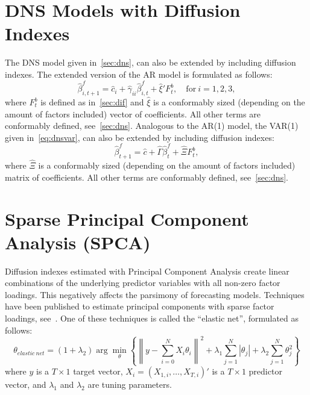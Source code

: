 \section{DNS Models with Diffusion Indexes}
\label{sec:dnsdif}
The DNS model given in~\cref{sec:dns}, can also be extended by including diffusion indexes. The extended version of the AR model is formulated as follows:
\begin{equation}
	\hat{\beta}_{i,t+1}^{f} = \hat{c}_i + \hat{\gamma}_{ii} \hat{\beta}_{i,t}^f + \hat{\xi}' F_t^b, \quad \text{for}~i = 1,2,3,
\end{equation}
where $F_t^b$ is defined as in~\cref{sec:dif} and $\hat{\xi}$ is a conformably sized (depending on the amount of factors included) vector of coefficients. 
All other terms are conformably defined, see~\cref{sec:dns}. 
Analogous to the AR(1) model, the VAR(1) given in~\cref{eq:dnsvar}, can also be extended by including diffusion indexes:
\begin{equation}
	\hat{\beta}_{t+1}^{f} = \hat{c} + \hat{\Gamma} \hat{\beta}_t^f + \hat{\Xi} F_t^b,
\end{equation}
where $\hat{\Xi}$ is a conformably sized (depending on the amount of factors included) matrix of coefficients. 
All other terms are conformably defined, see~\cref{sec:dns}.

\section{Sparse Principal Component Analysis (SPCA)}
\label{sec:spca}
Diffusion indexes estimated with Principal Component Analysis create linear combinations of the underlying predictor variables with all non-zero factor loadings. 
This negatively affects the parsimony of forecasting models. 
Techniques have been published to estimate principal components with sparse factor loadings, see~\textcite{Zou2006}. 
One of these techniques is called the \enquote{elastic net}, formulated as follows:
\begin{equation}
	\theta_{elastic\ net} = (1 + \lambda_2) \arg \underset{\theta}{\min} \left\{{\left\| y - \sum_{i=0}^{N} X_i \theta_i \right\|}^2 + \lambda_1 \sum_{j=1}^N \left|\theta_j\right| + \lambda_2 \sum_{j=1}^N \theta_j^2 \right\}
\end{equation}
where $y$ is a $T \times 1$ target vector, $X_i = \left(X_{1,i}, \dots, X_{T,i}\right)'$ is a $T \times 1$ predictor vector, and $\lambda_1$ and $\lambda_2$ are tuning parameters.

